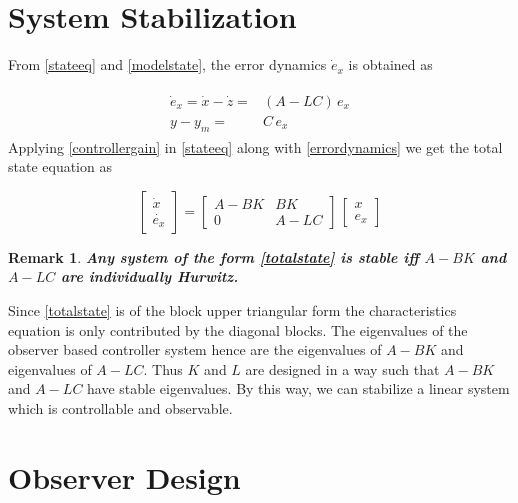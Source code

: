 \documentclass{elsarticle}
\newtheorem{Remark}{Remark}
\numberwithin{equation}{section}
\begin{document}
\section{System Stabilization}

From \eqref{stateeq} and \eqref{modelstate}, the error dynamics $\dot{e}_x$ is obtained as

\begin{align}\label{errordynamics}
	\begin{split}
	\dot{e}_x = \dot{x}-\dot{z} =& (A - LC)\,e_x \\
	y - y_m =& C\,e_x
	\end{split}
\end{align} 
Applying \eqref{controllergain} in \eqref{stateeq} along with \eqref{errordynamics} we get the total state equation as

\begin{equation}\label{totalstate}
	\begin{bmatrix}
	\dot{x} \\
	\dot{e_x}
	\end{bmatrix}
	=
	\begin{bmatrix}
	A-BK & BK \\
	0 & A-LC
	\end{bmatrix}
	\,
	\begin{bmatrix}
	x \\
	e_x
	\end{bmatrix}
\end{equation}

\begin{Remark}\textbf{
Any system of the form \eqref{totalstate} is stable iff $A-BK$ and $A-LC$ are individually Hurwitz.}\\
\end{Remark}

Since \eqref{totalstate} is of the block upper triangular form the characteristics equation is only contributed by the diagonal blocks. The eigenvalues of the observer based controller system hence are the eigenvalues of $A-BK$ and eigenvalues of $A-LC$. Thus $K$ and $L$ are designed in a way such that $A-BK$ and $A-LC$ have stable eigenvalues. By this way, we can stabilize a linear system which is controllable and observable. %

\section{Observer Design}
\end{document}
